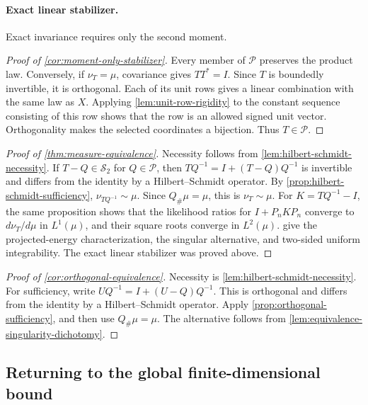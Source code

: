 \paragraph{Exact linear stabilizer.}
Exact invariance requires only the second moment.

\begin{proof}[Proof of \cref{cor:moment-only-stabilizer}]
Every member of $\mathcal P$ preserves the product law.
Conversely, if $\nu_T=\mu$, covariance gives $TT^*=I$.
Since $T$ is boundedly invertible, it is orthogonal.  Each of its unit
rows gives a linear combination with the same law as $X$.
Applying \cref{lem:unit-row-rigidity} to the constant sequence
consisting of this row shows that the row is an allowed signed unit
vector.  Orthogonality makes the selected coordinates a bijection.
Thus $T\in\mathcal P$.
\end{proof}
\begin{proof}[Proof of \cref{thm:measure-equivalence}]
Necessity follows from \cref{lem:hilbert-schmidt-necessity}.  If
$T-Q\in\mathcal S_2$ for $Q\in\mathcal P$, then
$TQ^{-1}=I+(T-Q)Q^{-1}$ is invertible and differs from the identity
by a Hilbert--Schmidt operator.  By \cref{prop:hilbert-schmidt-sufficiency},
$\nu_{TQ^{-1}}\sim\mu$.  Since $Q_\#\mu=\mu$, this is
$\nu_T\sim\mu$.  For \(K=TQ^{-1}-I\), the same proposition shows that the
likelihood ratios for \(I+P_nKP_n\) converge to \(d\nu_T/d\mu\) in
\(L^1(\mu)\), and their square roots converge in \(L^2(\mu)\).
 give the
projected-energy characterization, the singular alternative, and two-sided
uniform integrability.  The exact linear stabilizer was proved above.
\end{proof}
\begin{proof}[Proof of \cref{cor:orthogonal-equivalence}]
Necessity is \cref{lem:hilbert-schmidt-necessity}.  For sufficiency, write
$UQ^{-1}=I+(U-Q)Q^{-1}$.  This is orthogonal and differs from the
identity by a Hilbert--Schmidt operator.  Apply
\cref{prop:orthogonal-sufficiency}, and then use
$Q_\#\mu=\mu$.  The alternative follows from
\cref{lem:equivalence-singularity-dichotomy}.
\end{proof}

\subsection{Returning to the global finite-dimensional bound}
\label{sec:globalization-proof}

